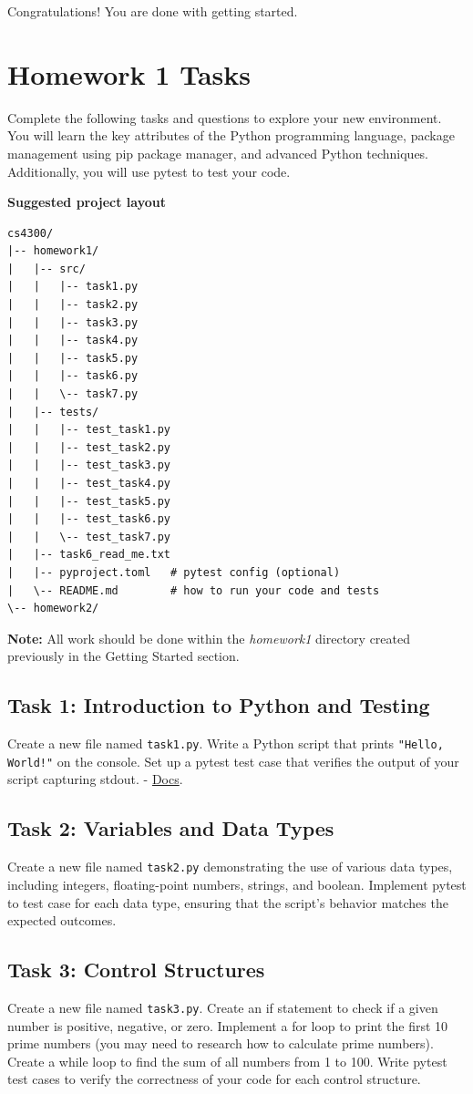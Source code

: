 \documentclass{article}
\begin{document}
Congratulations! You are done with getting started. 

\section{Homework 1 Tasks}
Complete the following tasks and questions to explore your new environment. You will learn the key attributes of the Python programming language, package management using pip package manager, and advanced Python techniques. Additionally, you will use pytest to test your code.
\newpage 
\begin{center}
\textbf{Suggested project layout}
\end{center}
\begin{lstlisting}[style=customcode]
cs4300/
|-- homework1/
|   |-- src/
|   |   |-- task1.py
|   |   |-- task2.py
|   |   |-- task3.py
|   |   |-- task4.py
|   |   |-- task5.py
|   |   |-- task6.py
|   |   \-- task7.py
|   |-- tests/
|   |   |-- test_task1.py
|   |   |-- test_task2.py
|   |   |-- test_task3.py
|   |   |-- test_task4.py
|   |   |-- test_task5.py
|   |   |-- test_task6.py
|   |   \-- test_task7.py
|   |-- task6_read_me.txt
|   |-- pyproject.toml   # pytest config (optional)
|   \-- README.md        # how to run your code and tests
\-- homework2/
\end{lstlisting}
\textbf{Note:} All work should be done within the \textit{homework1} directory created previously in the Getting Started section.

\subsection{Task 1: Introduction to Python and Testing}
Create a new file named \verb|task1.py|. Write a Python script that prints \verb|"Hello, World!"| on the console. Set up a pytest test case that verifies the output of your script capturing stdout. - \href{https://docs.pytest.org/en/stable/getting-started.html}{Docs}. 

\subsection{Task 2: Variables and Data Types}
Create a new file named \verb|task2.py| demonstrating the use of various data types, including integers, floating-point numbers, strings, and boolean. Implement pytest to test case for each data type, ensuring that the script's behavior matches the expected outcomes.

\subsection{Task 3: Control Structures}
Create a new file named \verb|task3.py|. Create an if statement to check if a given number is positive, negative, or zero. Implement a for loop to print the first 10 prime numbers (you may need to research how to calculate prime numbers). Create a while loop to find the sum of all numbers from 1 to 100. Write pytest test cases to verify the correctness of your code for each control structure.
\end{document}
